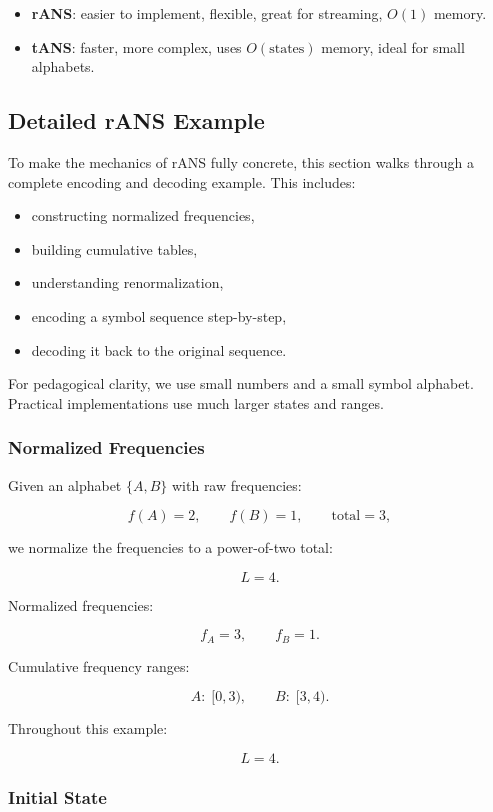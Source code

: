 \begin{itemize}
    \item \textbf{rANS}: easier to implement, flexible, great for streaming, $O(1)$ memory.
    \item \textbf{tANS}: faster, more complex, uses $O(\text{states})$ memory, ideal for small alphabets.
\end{itemize}

\subsection{Detailed rANS Example}

To make the mechanics of rANS fully concrete, this section walks through a complete encoding and decoding example.  
This includes:

\begin{itemize}
    \item constructing normalized frequencies,
    \item building cumulative tables,
    \item understanding renormalization,
    \item encoding a symbol sequence step-by-step,
    \item decoding it back to the original sequence.
\end{itemize}

For pedagogical clarity, we use small numbers and a small symbol alphabet.  
Practical implementations use much larger states and ranges.

\subsubsection{Normalized Frequencies}

Given an alphabet $\{A, B\}$ with raw frequencies:

\[
f(A)=2,\qquad f(B)=1,\qquad \text{total}=3,
\]

we normalize the frequencies to a power-of-two total:

\[
L = 4.
\]

Normalized frequencies:

\[
f_A = 3,\qquad f_B = 1.
\]

Cumulative frequency ranges:

\[
A:\; [0,3),\qquad B:\; [3,4).
\]

Throughout this example:

\[
L = 4.
\]

\subsubsection{Initial State}

